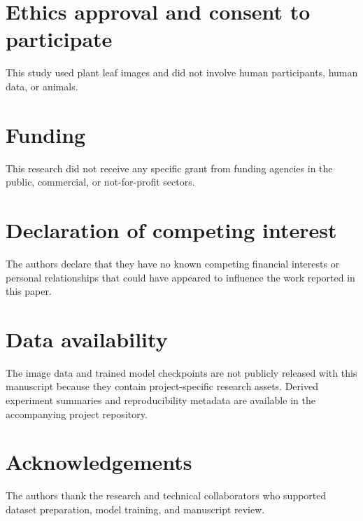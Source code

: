 \documentclass[final,5p,times,twocolumn,authoryear]{elsarticle}
\begin{document}
\section*{Ethics approval and consent to participate}
\noindent This study used plant leaf images and did not involve human participants, human data, or animals.

\section*{Funding}
\noindent This research did not receive any specific grant from funding agencies in the public, commercial, or not-for-profit sectors.

\section*{Declaration of competing interest}
\noindent The authors declare that they have no known competing financial interests or personal relationships that could have appeared to influence the work reported in this paper.

\section*{Data availability}
\noindent The image data and trained model checkpoints are not publicly released with this manuscript because they contain project-specific research assets. Derived experiment summaries and reproducibility metadata are available in the accompanying project repository.

\section*{Acknowledgements}
\noindent The authors thank the research and technical collaborators who supported dataset preparation, model training, and manuscript review.
\end{document}
